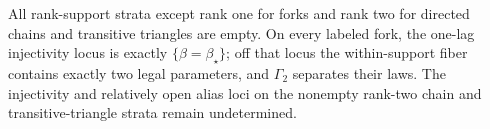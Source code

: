 All rank-support strata except rank one for forks and rank two for directed chains and transitive triangles are empty.  On every labeled fork, the one-lag injectivity locus is exactly \(\{\beta=\beta_\star\}\); off that locus the within-support fiber contains exactly two legal parameters, and \(\Gamma_2\) separates their laws.  The injectivity and relatively open alias loci on the nonempty rank-two chain and transitive-triangle strata remain undetermined.